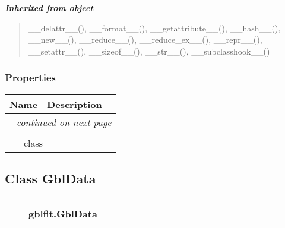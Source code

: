 \large{\textbf{\textit{Inherited from object}}}

\begin{quote}
\_\_delattr\_\_(), \_\_format\_\_(), \_\_getattribute\_\_(), \_\_hash\_\_(), \_\_new\_\_(), \_\_reduce\_\_(), \_\_reduce\_ex\_\_(), \_\_repr\_\_(), \_\_setattr\_\_(), \_\_sizeof\_\_(), \_\_str\_\_(), \_\_subclasshook\_\_()
\end{quote}


  \subsubsection{Properties}

    \vspace{-1cm}
\hspace{\varindent}\begin{longtable}{|p{\varnamewidth}|p{\vardescrwidth}|l}
\cline{1-2}
\cline{1-2} \centering \textbf{Name} & \centering \textbf{Description}& \\
\cline{1-2}
\endhead\cline{1-2}\multicolumn{3}{r}{\small\textit{continued on next page}}\\\endfoot\cline{1-2}
\endlastfoot\multicolumn{2}{|l|}{\textit{Inherited from object}}\\
\multicolumn{2}{|p{\varwidth}|}{\raggedright \_\_class\_\_}\\
\cline{1-2}
\end{longtable}



\subsection{Class GblData}

    \label{gblfit:GblData}
\begin{tabular}{cccccc}
\multicolumn{2}{r}{\settowidth{\BCL}{object}\multirow{2}{\BCL}{object}}
&&
  \\\cline{3-3}
  &&\multicolumn{1}{c|}{}
&&
  \\
&&\multicolumn{2}{l}{\textbf{gblfit.GblData}}
\end{tabular}

